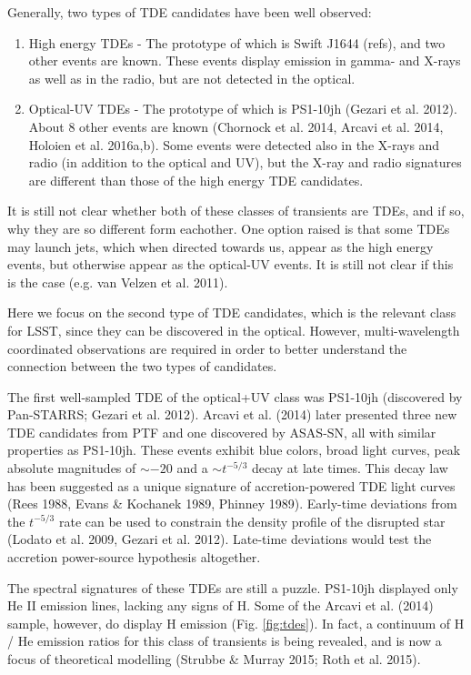 Generally, two types of TDE candidates have been well observed:
\begin{enumerate}
\item High energy TDEs - The prototype of which is Swift J1644 (refs), and two
other events are known. These events display emission in gamma- and X-rays as well as
in the radio, but are not detected in the optical. 
\item Optical-UV TDEs - The prototype of which is PS1-10jh (Gezari et al. 2012).
About $8$ other events are known (Chornock et al. 2014, Arcavi et al. 2014, Holoien et al. 2016a,b).
Some events were detected also in the X-rays and radio (in addition to the optical and UV),
but the X-ray and radio signatures are different than those of the high energy TDE candidates.
\end{enumerate}

It is still not clear whether both of these classes of transients are TDEs, 
and if so, why they are so different form eachother. One option raised is 
that some TDEs may launch jets, which when directed towards us, appear as
the high energy events, but otherwise appear as the optical-UV events.
It is still not clear if this is the case (e.g. van Velzen et al. 2011).

Here we focus on the second type of TDE candidates, which is the relevant
class for LSST, since they can be discovered in the optical. However,
multi-wavelength coordinated observations are required in order to better 
understand the connection between the two types of candidates.

The first well-sampled TDE of the optical+UV class was PS1-10jh (discovered by Pan-STARRS;
Gezari et al. 2012). Arcavi et al. (2014) later presented three new TDE candidates
from PTF and one discovered by ASAS-SN, all with similar properties
as PS1-10jh. These events exhibit blue colors, broad light curves,
peak absolute magnitudes of $\sim-20$ and a $\sim t^{-5/3}$ decay
at late times. This decay law has been suggested as a unique signature
of accretion-powered TDE light curves (Rees 1988, Evans \& Kochanek
1989, Phinney 1989). Early-time deviations from the $t^{-5/3}$ rate
can be used to constrain the density profile of the disrupted star
(Lodato et al. 2009, Gezari et al. 2012). Late-time deviations would
test the accretion power-source hypothesis altogether. 

The spectral signatures of these TDEs are still a puzzle. PS1-10jh displayed
only He II emission lines, lacking any signs of H. Some of the Arcavi
et al. (2014) sample, however, do display H emission (Fig. \ref{fig:tdes}).
In fact, a continuum of H / He emission ratios for this class of transients
is being revealed, and is now a focus of theoretical modelling (Strubbe
\& Murray 2015; Roth et al. 2015).

